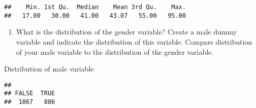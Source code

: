 \documentclass[]{article}
\newenvironment{Shaded}{\begin{snugshade}}{\end{snugshade}}
\newcommand{\KeywordTok}[1]{\textcolor[rgb]{0.13,0.29,0.53}{\textbf{#1}}}
\newcommand{\DecValTok}[1]{\textcolor[rgb]{0.00,0.00,0.81}{#1}}
\newcommand{\StringTok}[1]{\textcolor[rgb]{0.31,0.60,0.02}{#1}}
\newcommand{\CommentTok}[1]{\textcolor[rgb]{0.56,0.35,0.01}{\textit{#1}}}
\newcommand{\OperatorTok}[1]{\textcolor[rgb]{0.81,0.36,0.00}{\textbf{#1}}}
\newcommand{\NormalTok}[1]{#1}
\providecommand{\tightlist}{%
  \setlength{\itemsep}{0pt}\setlength{\parskip}{0pt}}
\begin{document}
\begin{Shaded}
\end{Shaded}

\begin{verbatim}
##    Min. 1st Qu.  Median    Mean 3rd Qu.    Max. 
##   17.00   30.00   41.00   43.07   55.00   95.00
\end{verbatim}

\begin{enumerate}
\def\labelenumi{\arabic{enumi})}
\setcounter{enumi}{3}
\tightlist
\item
  What is the distribution of the gender variable? Create a male dummy
  variable and indicate the distribution of this variable. Compare
  distribution of your male variable to the distribution of the gender
  variable.
\end{enumerate}

\begin{Shaded}
\end{Shaded}

Distribution of male variable

\begin{Shaded}
\end{Shaded}

\begin{verbatim}
## 
## FALSE  TRUE 
##  1067   886
\end{verbatim}
\end{document}
